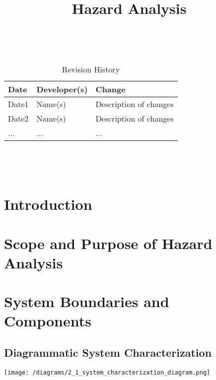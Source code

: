 \documentclass{article}
\title{Hazard Analysis\\\progname}
\author{\authname}
\date{}
\begin{document}
\maketitle
\thispagestyle{empty}

~\newpage


\begin{table}[hp]
\caption{Revision History} \label{TblRevisionHistory}
\begin{tabularx}{\textwidth}{llX}
\toprule
\textbf{Date} & \textbf{Developer(s)} & \textbf{Change}\\
\midrule
Date1 & Name(s) & Description of changes\\
Date2 & Name(s) & Description of changes\\
... & ... & ...\\
\bottomrule
\end{tabularx}
\end{table}

~\newpage

\tableofcontents

~\newpage



\section{Introduction}


\section{Scope and Purpose of Hazard Analysis}


\section{System Boundaries and Components}
\subsection{Diagrammatic System Characterization}
\begin{center}
    \texttt{[image: /diagrams/2\_1\_system\_characterization\_diagram.png]}
\end{center}
\end{document}
